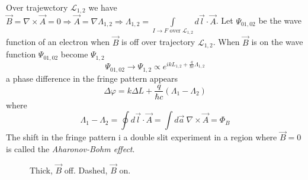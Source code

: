 \documentclass[12pt,a4paper]{article}
\begin{document}
Over trajewctory $\mathcal{L}_{1,2}$ we have $\vec{B}=\nabla \times \vec{A} = 0 \Rightarrow \vec{A} =  \nabla \Lambda_{1,2} \Rightarrow \Lambda_{1,2} = \int\limits_{I\rightarrow F \text{ over } \mathcal{L}_{1,2}}{}{d\vec{l}\cdot\vec{A}}$. Let $\Psi_{01,02}$ be the wave function of an electron when $\vec{B}$ is off over trajectory $\mathcal{L}_{1,2}$. When $\vec{B}$ is on the wave function $\Psi_{01,02}$ become $\Psi_{1,2}$
\begin{equation}
	\Psi_{01,02} \rightarrow \Psi_{1,2} \propto e^{ikL_{1,2}+ \frac{q}{\hbar c}\Lambda_{1,2}}
\end{equation}
a phase difference in the fringe pattern appears
\begin{equation}
	 \Delta \varphi = k\Delta L +\frac{q}{\hbar c}(\Lambda_1 - \Lambda_2)
\end{equation}
where
\begin{equation}
\Lambda_1 - \Lambda_2 = \oint d \vec{l} \cdot \vec{A} = \int d\vec{a} \ \nabla \times \vec{A} = \Phi_B
\end{equation}
The shift in the fringe pattern i a double slit experiment in a region where $\vec{B} = 0$ is called the \textit{Aharonov-Bohm effect}. 

\begin{figure}[h]
	\centering
	\caption{Thick, $\vec{B}$ off. Dashed, $\vec{B}$ on.}
\end{figure}
\end{document}
